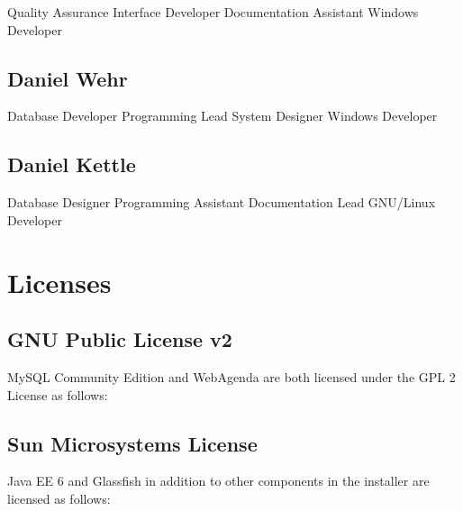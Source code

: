 \documentclass[a4paper,10pt]{report}
\begin{document}
Quality Assurance \newline
Interface Developer \newline
Documentation Assistant \newline
Windows Developer

\section{Daniel Wehr}

Database Developer \newline
Programming Lead \newline
System Designer \newline
Windows Developer

\section{Daniel Kettle}

Database Designer \newline
Programming Assistant \newline
Documentation Lead \newline
GNU/Linux Developer


\appendix

\chapter{Licenses}

\section{GNU Public License v2}

\par \noindent \hspace*{1cm} MySQL Community Edition and WebAgenda are both licensed under the GPL 2 License as follows:



\newpage

\section{Sun Microsystems License}

\par \noindent \hspace*{1cm} Java EE 6 and Glassfish in addition to other components in the installer are licensed as follows:


\end{document}
